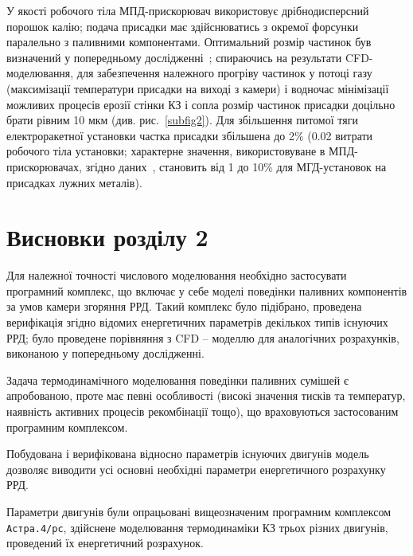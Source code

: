 У якості робочого тіла МПД-прискорювач використовує дрібнодисперсний порошок калію; подача присадки має здійснюватись з окремої форсунки паралельно з паливними компонентами. Оптимальний розмір частинок був визначений у попередньому дослідженні~\cite{Previous}; спираючись на результати CFD-моделювання, для забезпечення належного прогріву частинок у потоці газу (максимізації температури присадки на виході з камери) і водночас мінімізації можливих процесів ерозії стінки КЗ і сопла розмір частинок присадки доцільно брати рівним 10 мкм (див. рис.~\ref{subfig2}). Для збільшення питомої тяги електроракетної установки частка присадки збільшена до 2\% (0.02 витрати робочого тіла установки; характерне значення, використовуване в МПД-прискорювачах, згідно даних~\cite{Panchenko}, становить від 1 до 10\% для МГД-установок на присадках лужних металів).

\section{Висновки розділу 2}

Для належної точності числового моделювання необхідно застосувати програмний комплекс, що включає у себе моделі поведінки паливних компонентів за умов камери згоряння РРД. Такий комплекс було підібрано, проведена верифікація згідно відомих енергетичних параметрів декількох типів існуючих РРД; було проведене порівняння з CFD -- моделлю для аналогічних розрахунків, виконаною у попередньому дослідженні.

Задача термодинамічного моделювання поведінки паливних сумішей є апробованою, проте має певні особливості (високі значення тисків та температур, наявність активних процесів рекомбінації тощо), що враховуються застосованим програмним комплексом.

Побудована і верифікована відносно параметрів існуючих двигунів модель дозволяє виводити усі основні необхідні параметри енергетичного розрахунку РРД.

Параметри двигунів були опрацьовані вищеозначеним програмним комплексом \texttt{Астра.4/рс}, здійснене моделювання термодинаміки КЗ трьох різних двигунів, проведений їх енергетичний розрахунок.   